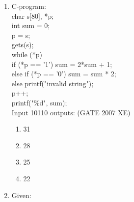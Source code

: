\documentclass[journal,cmex10]{IEEEtran}
\theoremstyle{remark}
\numberwithin{equation}{enumi}
\numberwithin{figure}{enumi}
\begin{document}
\begin{enumerate}[label=\arabic*)]
real function print\_value(x)\\
i = 0; sum = 2.0; term = 1.0\\
do while (term $>$ 0.00001)\\
   term = x * term / (i+1)\\
   sum = sum + term\\
   i = i + 1\\
end do\\
    Called with x = 1  outputs close to:
    \hfill{(GATE 2007 XE)}
    \begin{multicols}{4}
    \begin{enumerate}
        \item ln2
        \item ln3
        \item 1 + e
        \item e
    \end{enumerate}
\end{multicols}

    \item C-program:\\

char s[80], *p;\\
int sum = 0;\\
p = s;\\
gets(s);\\
while (*p) {\\
  if (*p == '1') sum = 2*sum + 1;\\
  else if (*p == '0') sum = sum * 2;\\
  else printf("invalid string");\\
  p++;\\
}
printf("\%d", sum);\\

    Input 10110 outputs:
    \hfill{(GATE 2007 XE)}
    \begin{multicols}{4}
    \begin{enumerate}
        \item 31
        \item 28
        \item 25
        \item 22
    \end{enumerate}
\end{multicols}


    \item Given:\\


\end{enumerate}
\end{document}
